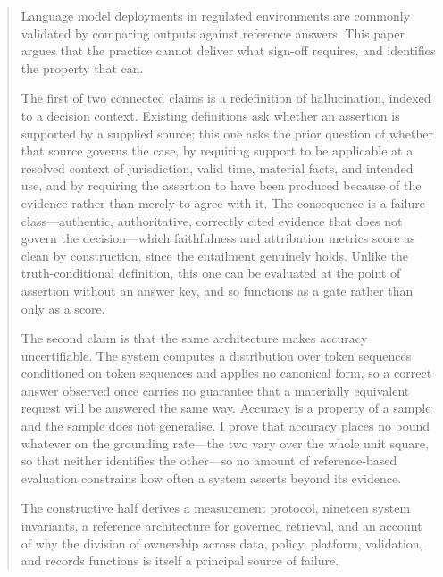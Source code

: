 \begin{abstract}
Language model deployments in regulated environments are commonly validated by
comparing outputs against reference answers. This paper argues that the practice cannot
deliver what sign-off requires, and identifies the property that can.

The first of two connected claims is a redefinition of hallucination, indexed to a
decision context. Existing definitions ask whether an assertion is supported by a
supplied source; this one asks the prior question of whether that source governs the
case, by requiring support to be applicable at a resolved context of jurisdiction, valid
time, material facts, and intended use, and by requiring the assertion to have been
produced because of the evidence rather than merely to agree with it. The consequence is
a failure class---authentic, authoritative, correctly cited evidence that does not govern
the decision---which faithfulness and attribution metrics score as clean by construction,
since the entailment genuinely holds. Unlike the truth-conditional definition, this one
can be evaluated at the point of assertion without an answer key, and so functions as a
gate rather than only as a score.

The second claim is that the same architecture makes accuracy uncertifiable. The system
computes a distribution over token sequences conditioned on token sequences and applies
no canonical form, so a correct answer observed once carries no guarantee that a
materially equivalent request will be answered the same way. Accuracy is a property of a
sample and the sample does not generalise. I prove that accuracy places no bound whatever
on the grounding rate---the two vary over the whole unit square, so that neither identifies the other---so no
amount of reference-based evaluation constrains how often a system asserts beyond its
evidence.

The constructive half derives a measurement protocol, nineteen system invariants, a
reference architecture for governed retrieval, and an account of why the division of
ownership across data, policy, platform, validation, and records functions is itself a
principal source of failure.
\end{abstract}
